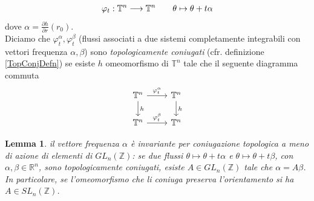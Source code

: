 \documentclass[twoside, 11pt]{amsbook}
\newcommand{\0}{{(0)}}
\newcommand{\3}{{(3)}}
\theoremstyle{colonplain}
\newtheorem{lemma}[thm]{Lemma}
\theoremstyle{colondefinition}
\theoremstyle{colonremark}
\numberwithin{equation}{chapter}
\begin{document}
\begin{align}
    \varphi_t : \mathbb{T}^n \longrightarrow \mathbb{T}^n \qquad \theta \mapsto \theta + t\alpha \notag
\end{align}
dove $\alpha = \frac{\partial h}{\partial r}(r_0)$. \\
Diciamo che $\varphi^\alpha_t, \varphi^\beta_t$ (flussi associati a due sistemi completamente integrabili con vettori frequenza $\alpha, \beta$) sono \textit{topologicamente coniugati} (cfr. definizione \ref{TopConjDefn}) se esiste $h$ omeomorfismo di $\mathbb{T}^n$ tale che il seguente diagramma commuta
\[
\begin{tikzcd}
\mathbb{T}^n
    \arrow[r, "\varphi^\alpha_{t}"]
    \arrow[d, "h"]
&
\mathbb{T}^n
    \arrow[d, "h"]
\\
\mathbb{T}^n
    \arrow[r, "\varphi^\beta_t"]
&
\mathbb{T}^n
\end{tikzcd}
\]
\begin{lemma}\label{FlowTopConj} il vettore frequenza $\alpha$ è invariante per coniugazione topologica a meno di azione di elementi di $GL_n(\mathbb{Z})$: se due flussi $\theta \mapsto \theta + t\alpha$ e $\theta \mapsto \theta + t\beta$, con $\alpha, \beta \in \mathbb{R}^n$, sono topologicamente coniugati, esiste $A \in GL_n(\mathbb{Z})$ tale che $\alpha = A\beta$. In particolare, se l'omeomorfismo che li coniuga preserva l'orientamento si ha $A \in SL_n(\mathbb{Z})$.
\end{lemma}
\end{document}
